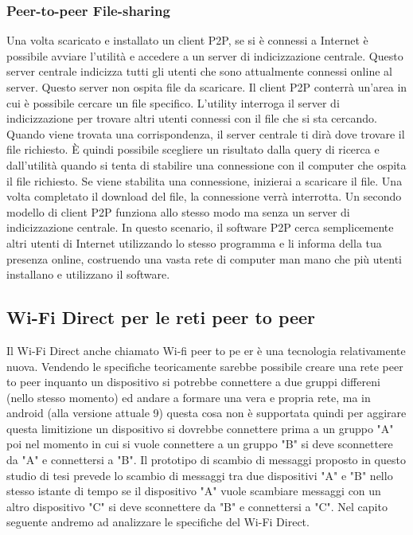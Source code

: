 \subsubsection{Peer-to-peer File-sharing}
Una volta scaricato e installato un client P2P, se si è connessi a Internet è
possibile avviare l'utilità e accedere a un server di indicizzazione centrale.
Questo server centrale indicizza tutti gli utenti che sono attualmente connessi
online al server. Questo server non ospita file da scaricare. Il client P2P
conterrà un'area in cui è possibile cercare un file specifico. L'utility
interroga il server di indicizzazione per trovare altri utenti connessi con il
file che si sta cercando. Quando viene trovata una corrispondenza, il server
centrale ti dirà dove trovare il file richiesto. È quindi possibile scegliere
un risultato dalla query di ricerca e dall'utilità quando si tenta di stabilire
una connessione con il computer che ospita il file richiesto. Se viene
stabilita una connessione, inizierai a scaricare il file. Una volta completato
il download del file, la connessione verrà interrotta.
Un secondo modello di client P2P funziona allo stesso modo ma senza un server
di indicizzazione centrale. In questo scenario, il software P2P cerca
semplicemente altri utenti di Internet utilizzando lo stesso programma e li
informa della tua presenza online, costruendo una vasta rete di computer man
mano che più utenti installano e utilizzano il software.

\subsection{Wi-Fi Direct per le reti peer to peer}

Il Wi-Fi Direct anche chiamato Wi-fi peer to pe er è una tecnologia
relativamente nuova.
Vendendo le specifiche teoricamente sarebbe possibile creare una rete
peer to peer inquanto un dispositivo si potrebbe connettere a due
gruppi differeni (nello stesso momento) ed andare a formare una 
vera e propria rete,
ma in android (alla versione attuale 9) questa cosa non è supportata
quindi per aggirare questa limitizione un dispositivo si dovrebbe 
connettere prima a un gruppo "A" poi nel momento in cui si vuole 
connettere a un gruppo "B"
si deve sconnettere da "A" e connettersi a "B".
Il prototipo di scambio di messaggi proposto in questo studio di
tesi prevede lo scambio di messaggi tra due dispositivi "A" e "B" 
nello stesso istante di
tempo se il dispositivo "A" vuole scambiare messaggi con un altro dispositivo "C"
si deve sconnettere da "B" e connettersi a "C".
Nel capito seguente andremo ad analizzare le specifiche del Wi-Fi Direct. 
